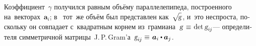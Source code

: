\begin{otherlanguage}{russian}
\vspace{-0.1em} \noindent Коэффициент~$\gamma$ получился равным объёму параллелепипеда, построенного на~векторах~$\bm{a}_i$; в~ тот~же объём был представлен как~\!${\sqrt{\hspace{-0.36ex}\mathstrut{\textsl{g}}}\hspace{0.16ex}}$, и~это неспроста, поскольку он совпадает с~квадратным корнем из~грамиана~\hbox{$\textsl{g} \hspace{0.1ex} \hspace{0.25ex} \equiv \hspace{0.2ex} \operatorname{det} \textsl{g}_{i\hspace{-0.1ex}j}$\hspace{-0.12ex}}\:--- определителя симметричной матрицы~\hbox{J.\,P.\,Gram’а}~${\textsl{g}_{i\hspace{-0.1ex}j} \hspace{-0.1ex} \hspace{0.16ex} \equiv \hspace{0.2ex} \bm{a}_i \dotp \bm{a}_j}$.



\end{otherlanguage}
